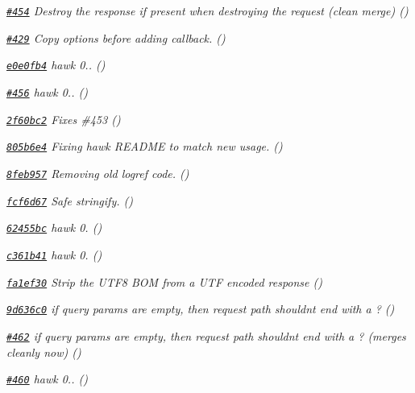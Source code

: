 \begin{DoxyItemize}
\item {\itshape \href{https://github.com/mikeal/request/pull/454}{\tt \#454} Destroy the response if present when destroying the request (clean merge) ()}
\item {\itshape \href{https://github.com/mikeal/request/pull/429}{\tt \#429} Copy options before adding callback. ()}
\item {\itshape \href{https://github.com/mikeal/request/commit/e0e0fb451f17945a02203639e4836aa327b4e30b}{\tt e0e0fb4} hawk 0.. ()}
\item {\itshape \href{https://github.com/mikeal/request/pull/456}{\tt \#456} hawk 0.. ()}
\item {\itshape \href{https://github.com/mikeal/request/commit/2f60bc253ff6e28df58a33da24b710b6d506849f}{\tt 2f60bc2} Fixes \#453 ()}
\item {\itshape \href{https://github.com/mikeal/request/commit/805b6e4fe3afeeb407b4fca2e34e9caabe30f747}{\tt 805b6e4} Fixing hawk R\+E\+A\+D\+M\+E to match new usage. ()}
\item {\itshape \href{https://github.com/mikeal/request/commit/8feb957911083bce552d1898b7ffcaa87104cd21}{\tt 8feb957} Removing old logref code. ()}
\item {\itshape \href{https://github.com/mikeal/request/commit/fcf6d6765247a2645a233d95468ade2960294074}{\tt fcf6d67} Safe stringify. ()}
\item {\itshape \href{https://github.com/mikeal/request/commit/62455bca81e8760f25a2bf1dec2b06c8e915de79}{\tt 62455bc} hawk 0. ()}
\item {\itshape \href{https://github.com/mikeal/request/commit/c361b4140e7e6e4fe2a8f039951b65d54af65f42}{\tt c361b41} hawk 0. ()}
\item {\itshape \href{https://github.com/mikeal/request/commit/fa1ef30dcdac83b271ce38c71975df0ed96b08f7}{\tt fa1ef30} Strip the U\+T\+F8 B\+O\+M from a U\+T\+F encoded response ()}
\item {\itshape \href{https://github.com/mikeal/request/commit/9d636c0b3e882742e15ba989d0c2413f95364680}{\tt 9d636c0} if query params are empty, then request path shouldn\textquotesingle{}t end with a \textquotesingle{}?\textquotesingle{} ()}
\item {\itshape \href{https://github.com/mikeal/request/pull/462}{\tt \#462} if query params are empty, then request path shouldn\textquotesingle{}t end with a \textquotesingle{}?\textquotesingle{} (merges cleanly now) ()}
\item {\itshape \href{https://github.com/mikeal/request/pull/460}{\tt \#460} hawk 0.. ()}

\end{DoxyItemize}

